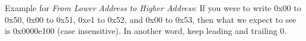 \documentclass[addpoints, 12pt, answers]{exam}
\begin{document}
\begin{questions}
\begin{parts}
		Example for \textit{From Lower Address to Higher Address}: If you were to write 0x00 to 0x50, 0x00 to 0x51, 0xe1 to 0x52, and 0x00 to 0x53, then what we expect to see is 0x0000e100 (case insensitive). In another word, keep leading and trailing 0.

	\end{parts}



\end{questions}
\end{document}
